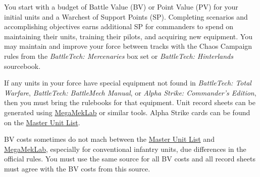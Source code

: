 You start with a budget of Battle Value (BV) or Point Value (PV) for your initial units and a Warchest of Support Points (SP).
Completing scenarios and accomplishing objectives earns additional SP for commanders to spend on maintaining their units, training their pilots, and acquiring new equipment.
You may maintain and improve your force between tracks with the Chaos Campaign rules from the \emph{BattleTech: Mercenaries} box set or \emph{BattleTech: Hinterlands} sourcebook.

If any units in your force have special equipment not found in \emph{BattleTech: Total Warfare}, \emph{BattleTech: BattleMech Manual}, or \emph{Alpha Strike: Commander's Edition}, then you must bring the rulebooks for that equipment.
Unit record sheets can be generated using \href{https://megamek.org}{MegaMekLab} or similar tools.
Alpha Strike cards can be found on the \href{http://www.masterunitlist.info}{Master Unit List}.

BV costs sometimes do not mach between the \href{http://www.masterunitlist.info}{Master Unit List} and \href{https://megamek.org}{MegaMekLab}, especially for conventional infantry units, due differences in the official rules.
You must use the same source for all BV costs and all record sheets must agree with the BV costs from this source.
